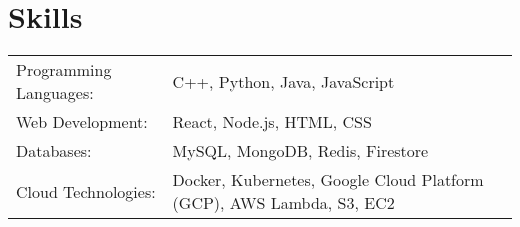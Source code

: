 \documentclass[a4paper,12pt]{article}
\begin{document}
\section{Skills}
\begin{tabularx}{\linewidth}{@{}l X@{}}
Programming Languages: & \normalsize{C++, Python, Java, JavaScript} \\
Web Development: & \normalsize{React, Node.js, HTML, CSS} \\
Databases: & \normalsize{MySQL, MongoDB, Redis, Firestore} \\
Cloud Technologies: & \normalsize{Docker, Kubernetes, Google Cloud Platform (GCP), AWS Lambda, S3, EC2} \\
\end{tabularx}

\vfill
{}
\end{document}
